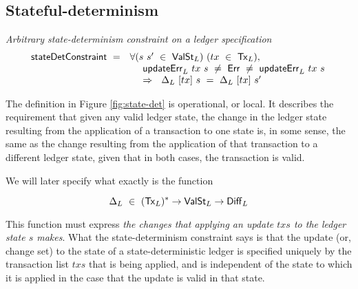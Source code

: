 
\subsection{Stateful-determinism}
\label{sec:state-det}

\begin{figure*}[htb]
  \emph{Arbitrary state-determinism constraint on a ledger specification}
  \begin{equation*}
    \begin{array}{l@{~~}l@{~~}ll}
    \fun{stateDetConstraint} ~=~ & \forall (s~s'~\in~\type{ValSt}_L)~(tx~\in~\type{Tx}_L),~\\
    & ~~~~\fun{updateErr}_L~tx~s~\neq~\Err~\neq~\fun{updateErr}_L~tx~s \\
    & ~~~~\Rightarrow~~\Delta_L~[tx]~s~=~\Delta_L~[tx]~s'
    \end{array}
  \end{equation*}
  \caption{State-determinism}
  \label{fig:state-det}
\end{figure*}


The definition in Figure \ref{fig:state-det} is operational, or local. It describes
the requirement that given any valid ledger state, the change in the ledger state
resulting from the application of a transaction to one state is, in some sense,
the same as the change resulting from the application of that transaction to a
different ledger state, given that in both cases, the transaction is valid.

We will later specify what exactly is the function

\[ \Delta_L~\in~(\mathsf{Tx}_L)^{*} \to \mathsf{ValSt}_L \to \mathsf{Diff}_L \]

This function must express \emph{the changes that applying
an update $txs$ to the ledger state $s$ makes}.
What the state-determinism constraint says is that the update (or, change set)
to the state of a state-deterministic ledger is specified uniquely by the transaction list
$txs$ that is being applied, and is independent of the state to which it is applied in the
case that the update is valid in that state.

